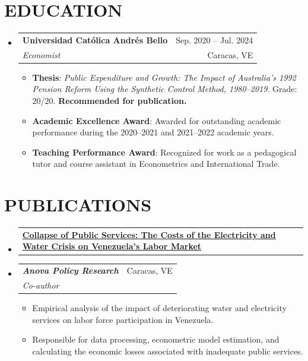 \documentclass[letterpaper,11pt]{article}
\makeatletter
\newcommand{\resumeItem}[1]{
  \item\small{
    {#1 \vspace{-1pt}}
  }
}
\newcommand{\resumeSubheading}[4]{
  \vspace{-1pt}\item
    \begin{tabular*}{\textwidth}[t]{l@{\extracolsep{\fill}}r}
      \textbf{#1} & {\color{dark-grey}\small #2}\vspace{1pt}\\ %
      \textit{#3} & {\color{dark-grey} \small #4}\\ %
    \end{tabular*}\vspace{-4pt}
}
\newcommand{\resumeProjectHeading}[2]{
    \item
    \begin{tabular*}{\textwidth}{l@{\extracolsep{\fill}}r}
      #1 & {\color{dark-grey}} \\
    \end{tabular*}\vspace{-4pt}
}
\newcommand{\resumeSubHeadingListStart}{\begin{itemize}[leftmargin=0in, label={}]}
\newcommand{\resumeSubHeadingListEnd}{\end{itemize}}
\newcommand{\resumeItemListStart}{\begin{itemize}}
\newcommand{\resumeItemListEnd}{\end{itemize}\vspace{0pt}}
\makeatother
\begin{document}
\section{EDUCATION}
  \resumeSubHeadingListStart
    \resumeSubheading
      {Universidad Católica Andrés Bello}{Sep. 2020 -- Jul. 2024}
      {Economist}{Caracas, VE}
        \resumeItemListStart
          \resumeItem{\textbf{Thesis}: \textit{Public Expenditure and Growth: The Impact of Australia's 1992 Pension Reform Using the Synthetic Control Method, 1980--2019}. Grade: 20/20. \textbf{Recommended for publication.}}
          \resumeItem{\textbf{Academic Excellence Award}: Awarded for outstanding academic performance during the 2020--2021 and 2021--2022 academic years.}
          \resumeItem{\textbf{Teaching Performance Award}: Recognized for work as a pedagogical tutor and course assistant in Econometrics and International Trade.}
        \resumeItemListEnd
  \resumeSubHeadingListEnd

\section{PUBLICATIONS}
  \resumeSubHeadingListStart

    \resumeProjectHeading
      {\textbf{\href{https://anova-evidence.org/2026/09/18/colapso-de-los-servicios-publicos-los-costos-de-la-crisis-de-electricidad-y-agua-sobre-el-mercado-laboral-de-venezuela/}{Collapse of Public Services: The Costs of the Electricity and Water Crisis on Venezuela's Labor Market}}}
      {September 2026}
    \vspace{-3pt}
    \resumeSubheading
      {\textit{Anova Policy Research}}{Caracas, VE}
      {Co-author}{}
      \resumeItemListStart
        \resumeItem{Empirical analysis of the impact of deteriorating water and electricity services on labor force participation in Venezuela.}
        \resumeItem{Responsible for data processing, econometric model estimation, and calculating the economic losses associated with inadequate public services.}
      \resumeItemListEnd

  \resumeSubHeadingListEnd

\end{document}
